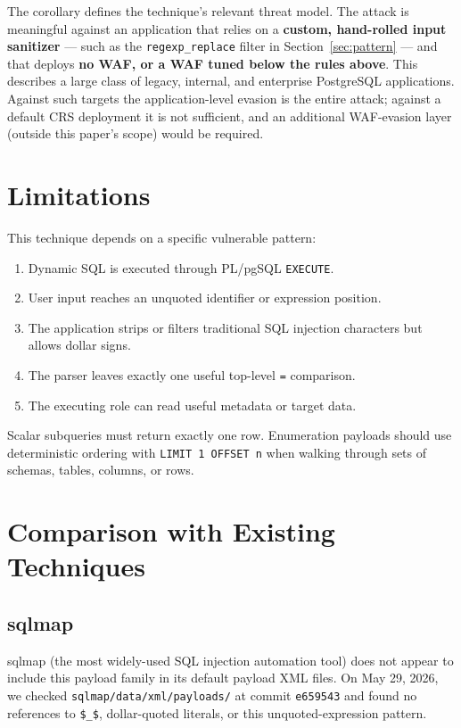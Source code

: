 \documentclass[11pt]{article}
\begin{document}
The corollary defines the technique's relevant threat model. The attack is
meaningful against an application that relies on a \textbf{custom, hand-rolled
input sanitizer} --- such as the \lstinline|regexp_replace| filter in
Section~\ref{sec:pattern} --- and that deploys \textbf{no WAF, or a WAF tuned
below the rules above}. This describes a large class of legacy, internal, and
enterprise PostgreSQL applications. Against such targets the application-level
evasion is the entire attack; against a default CRS deployment it is not
sufficient, and an additional WAF-evasion layer (outside this paper's scope) would
be required.

\section{Limitations}

This technique depends on a specific vulnerable pattern:

\begin{enumerate}[leftmargin=1.8em]
  \item Dynamic SQL is executed through PL/pgSQL \lstinline|EXECUTE|.
  \item User input reaches an unquoted identifier or expression position.
  \item The application strips or filters traditional SQL injection characters but
        allows dollar signs.
  \item The parser leaves exactly one useful top-level \lstinline|=| comparison.
  \item The executing role can read useful metadata or target data.
\end{enumerate}

Scalar subqueries must return exactly one row. Enumeration payloads should use
deterministic ordering with \lstinline|LIMIT 1 OFFSET n| when walking through sets
of schemas, tables, columns, or rows.

\section{Comparison with Existing Techniques}\label{sec:comparison}

\subsection{sqlmap}
sqlmap (the most widely-used SQL injection automation tool) does not appear to
include this payload family in its default payload XML files. On May 29, 2026, we
checked \lstinline|sqlmap/data/xml/payloads/| at commit \lstinline|e659543| and
found no references to \lstinline|$_$|, dollar-quoted literals, or this
unquoted-expression pattern.
\end{document}
